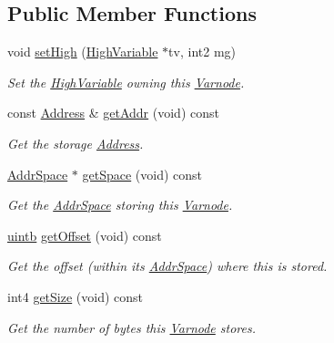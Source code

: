 \subsection*{Public Member Functions}
\begin{DoxyCompactItemize}
\item 
void \mbox{\hyperlink{class_varnode_a22f87b67491d66a91480feb87ad69102}{set\+High}} (\mbox{\hyperlink{class_high_variable}{High\+Variable}} $\ast$tv, int2 mg)
\begin{DoxyCompactList}\small\item\em Set the \mbox{\hyperlink{class_high_variable}{High\+Variable}} owning this \mbox{\hyperlink{class_varnode}{Varnode}}. \end{DoxyCompactList}\item 
const \mbox{\hyperlink{class_address}{Address}} \& \mbox{\hyperlink{class_varnode_a51db4f44a73d1173895d96d987df2d43}{get\+Addr}} (void) const
\begin{DoxyCompactList}\small\item\em Get the storage \mbox{\hyperlink{class_address}{Address}}. \end{DoxyCompactList}\item 
\mbox{\hyperlink{class_addr_space}{Addr\+Space}} $\ast$ \mbox{\hyperlink{class_varnode_acc7c4a2632f1814566862aeb524baf93}{get\+Space}} (void) const
\begin{DoxyCompactList}\small\item\em Get the \mbox{\hyperlink{class_addr_space}{Addr\+Space}} storing this \mbox{\hyperlink{class_varnode}{Varnode}}. \end{DoxyCompactList}\item 
\mbox{\hyperlink{types_8h_a2db313c5d32a12b01d26ac9b3bca178f}{uintb}} \mbox{\hyperlink{class_varnode_a8682cfcfcbb5c332c8216baf8aeaab1b}{get\+Offset}} (void) const
\begin{DoxyCompactList}\small\item\em Get the offset (within its \mbox{\hyperlink{class_addr_space}{Addr\+Space}}) where this is stored. \end{DoxyCompactList}\item 
int4 \mbox{\hyperlink{class_varnode_aa4503b07c50775a35605280fd7720393}{get\+Size}} (void) const
\begin{DoxyCompactList}\small\item\em Get the number of bytes this \mbox{\hyperlink{class_varnode}{Varnode}} stores. \end{DoxyCompactList}\item 

\end{DoxyCompactItemize}
